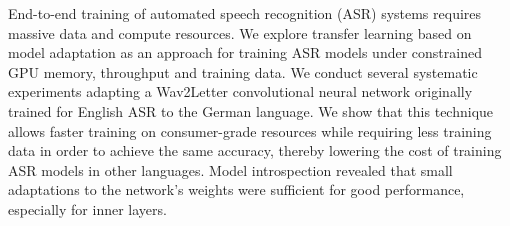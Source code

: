 End-to-end training of automated speech recognition (ASR) systems requires massive data and compute resources. We explore transfer learning based on model adaptation as an approach for training ASR models under constrained GPU memory, throughput and training data. We conduct several systematic experiments adapting a Wav2Letter convolutional neural network originally trained for English ASR to the German language. We show that this technique allows faster training on consumer-grade resources while requiring less training data in order to achieve the same accuracy, thereby lowering the cost of training ASR models in other languages. Model introspection revealed that small adaptations to the network's weights were sufficient for good performance, especially for inner layers.
